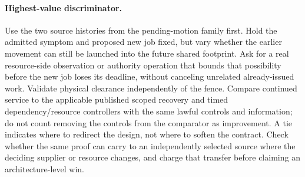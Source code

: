 \documentclass[11pt]{article}
\begin{document}
\paragraph{Highest-value discriminator.}
Use the two source histories from the pending-motion family first. Hold the admitted symptom and proposed new job fixed, but vary whether the earlier movement can still be launched into the future shared footprint. Ask for a real resource-side observation or authority operation that bounds that possibility before the new job loses its deadline, without canceling unrelated already-issued work. Validate physical clearance independently of the fence. Compare continued service to the applicable published scoped recovery and timed dependency/resource controllers with the same lawful controls and information; do not count removing the controls from the comparator as improvement. A tie indicates where to redirect the design, not where to soften the contract. Check whether the same proof can carry to an independently selected source where the deciding supplier or resource changes, and charge that transfer before claiming an architecture-level win.
\end{document}
